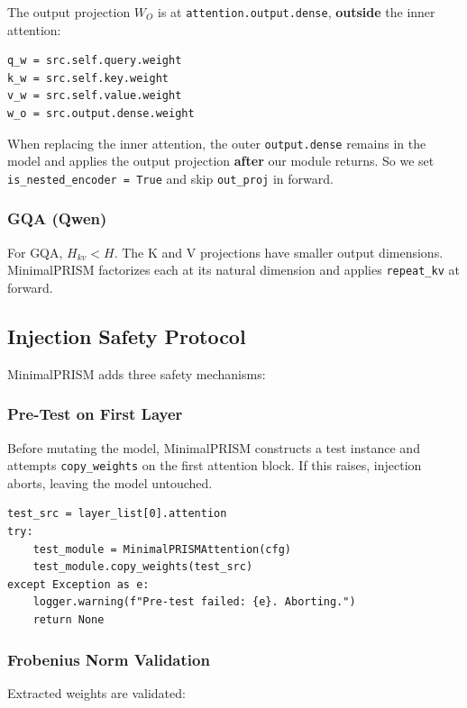 The output projection $W_O$ is at \texttt{attention.output.dense}, \textbf{outside} the 
inner attention:

\begin{lstlisting}
q_w = src.self.query.weight
k_w = src.self.key.weight
v_w = src.self.value.weight
w_o = src.output.dense.weight
\end{lstlisting}

When replacing the inner attention, the outer \texttt{output.dense} remains in the 
model and applies the output projection \textbf{after} our module returns. So we 
set \texttt{is\_nested\_encoder = True} and skip \texttt{out\_proj} in forward.

\subsubsection{GQA (Qwen)}

For GQA, $H_{kv} < H$. The K and V projections have smaller output 
dimensions. MinimalPRISM factorizes each at its natural dimension and applies 
\texttt{repeat\_kv} at forward.

\subsection{Injection Safety Protocol}

MinimalPRISM adds three safety mechanisms:

\subsubsection{Pre-Test on First Layer}

Before mutating the model, MinimalPRISM constructs a test instance and 
attempts \texttt{copy\_weights} on the first attention block. If this raises, 
injection aborts, leaving the model untouched.

\begin{lstlisting}
test_src = layer_list[0].attention
try:
    test_module = MinimalPRISMAttention(cfg)
    test_module.copy_weights(test_src)
except Exception as e:
    logger.warning(f"Pre-test failed: {e}. Aborting.")
    return None
\end{lstlisting}

\subsubsection{Frobenius Norm Validation}

Extracted weights are validated:

